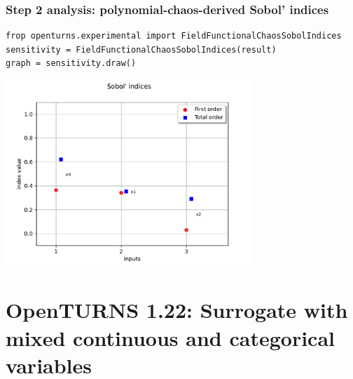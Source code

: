\documentclass{beamer}
\begin{document}
\begin{frame}[containsverbatim]
\frametitle{Step 2 analysis: polynomial-chaos-derived Sobol' indices}

\begin{lstlisting}
frop openturns.experimental import FieldFunctionalChaosSobolIndices
sensitivity = FieldFunctionalChaosSobolIndices(result)
graph = sensitivity.draw()
\end{lstlisting}

\centering
\includegraphics[width=0.7\textwidth]{figures/sobol.pdf}

\end{frame}
  
\section[OpenTURNS 1.22: Surrogate with categorical variables]{OpenTURNS 1.22: Surrogate with mixed continuous and categorical variables}
\end{document}
